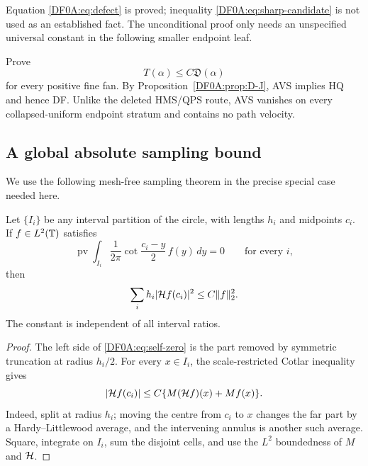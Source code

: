 \begin{remark}
Equation \eqref{DF0A:eq:defect} is proved; inequality
\eqref{DF0A:eq:sharp-candidate} is not used as an established fact.  The
unconditional proof only needs an unspecified universal constant in the
following smaller endpoint leaf.
\end{remark}

\begin{obligation}
\label{DF0A:obl:AVS}
Prove
\begin{equation}\label{DF0A:eq:AVS}
 \boxed{T(\alpha)\le C\mathfrak D(\alpha)}
\end{equation}
for every positive fine fan.  By Proposition~\ref{DF0A:prop:D-J}, AVS implies
HQ and hence DF.  Unlike the deleted HMS/QPS route, AVS vanishes on every
collapsed-uniform endpoint stratum and contains no path velocity.
\end{obligation}

\subsection{A global absolute sampling bound}

We use the following mesh-free sampling theorem in the precise special
case needed here.

\begin{lemma}
\label{DF0A:lem:sampling}
Let $\{I_i\}$ be any interval partition of the circle, with lengths
$h_i$ and midpoints $c_i$.  If $f\in L^2(\mathbb T)$ satisfies
\begin{equation}\label{DF0A:eq:self-zero}
 \operatorname {pv}\int_{I_i}\frac1{2\pi}
 \cot\frac{c_i-y}{2}\,f(y)\,dy=0
 \qquad\text{for every }i,
\end{equation}
then
\begin{equation}\label{DF0A:eq:sampling}
 \sum_i h_i|\mathcal H f(c_i)|^2\le C\|f\|_2^2.
\end{equation}
The constant is independent of all interval ratios.
\end{lemma}

\begin{proof}
The left side of \eqref{DF0A:eq:self-zero} is the part removed by symmetric
truncation at radius $h_i/2$.  For every $x\in I_i$, the
scale-restricted Cotlar inequality gives
\[
 |\mathcal H f(c_i)|\le C\{M(\mathcal H f)(x)+Mf(x)\}.
\]
Indeed, split at radius $h_i$; moving the centre from $c_i$ to $x$
changes the far part by a Hardy--Littlewood average, and the intervening
annulus is another such average.  Square, integrate on $I_i$, sum the
disjoint cells, and use the $L^2$ boundedness of $M$ and $\mathcal H$.
\end{proof}

